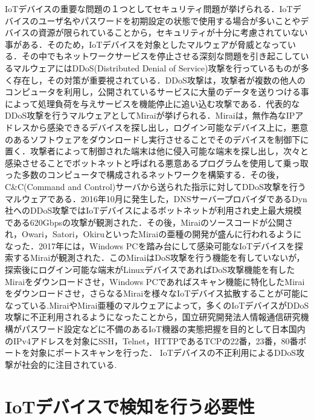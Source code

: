 IoTデバイスの重要な問題の１つとしてセキュリティ問題が挙げられる．IoTデバイスのユーザ名やパスワードを初期設定の状態で使用する場合が多いことやデバイスの資源が限られていることから，セキュリティが十分に考慮されていない事がある．そのため，IoTデバイスを対象としたマルウェアが脅威となっている．その中でもネットワークサービスを停止させる深刻な問題を引き起こしているマルウェアにはDDoS(Distributed Denial of Service)攻撃を行っているものが多く存在し，その対策が重要視されている．DDoS攻撃は，攻撃者が複数の他人のコンピュータを利用し，公開されているサービスに大量のデータを送りつける事によって処理負荷を与えサービスを機能停止に追い込む攻撃である．代表的なDDoS攻撃を行うマルウェアとしてMiraiが挙げられる．Mirai\cite{Mirai}は，無作為なIPアドレスから感染できるデバイスを探し出し，ログイン可能なデバイス上に，悪意のあるソフトウェアをダウンロードし実行させることでそのデバイスを制御下に置く．攻撃者によって制御された端末は他に侵入可能な端末を探し出し，次々と感染させることでボットネットと呼ばれる悪意あるプログラムを使用して乗っ取った多数のコンピュータで構成されるネットワークを構築する．その後，C\&C(Command and Control)サーバから送られた指示に対してDDoS攻撃を行うマルウェアである．2016年10月に発生した，DNSサーバープロバイダであるDyn社へのDDoS攻撃ではIoTデバイスによるボットネットが利用され史上最大規模である620Gbpsの攻撃が観測された\cite{Dyn}．その後，Miraiのソースコードが公開され，Owari，Satori，OkiruといったMiraiの亜種の開発が盛んに行われるようになった．2017年には，Windows PCを踏み台にして感染可能なIoTデバイスを探索するMiraiが観測された\cite{newMirai}．このMiraiはDoS攻撃を行う機能を有していないが，探索後にログイン可能な端末がLinuxデバイスであればDoS攻撃機能を有したMiraiをダウンロードさせ，Windows PCであればスキャン機能に特化したMiraiをダウンロードさせ，さらなるMiraiを様々なIoTデバイス拡散することが可能になっている.MiraiやMirai亜種のマルウェアによって，多くのIoTデバイスがDDoS攻撃に不正利用されるようになったことから，国立研究開発法人情報通信研究機構がパスワード設定などに不備のあるIoT機器の実態把握を目的として日本国内のIPv4アドレスを対象にSSH，Telnet，HTTPであるTCPの22番，23番，80番ポートを対象にポートスキャンを行った\cite{国立}．
IoTデバイスの不正利用によるDDoS攻撃が社会的に注目されている.

\section{IoTデバイスで検知を行う必要性}

